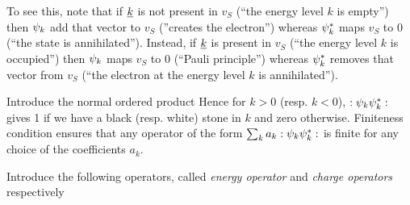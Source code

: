 \documentclass[../main/main.tex]{subfiles}
\begin{document}
To see this, note that if $\underline{k}$ is not present in $v_S$ (``the energy level $k$ is empty'') then $\psi_k$ add that vector to $v_S$ (''creates the electron'') whereas $\psi_k^*$ maps $v_S$ to 0 (``the state is annihilated''). Instead, if $\underline{k}$ is present in $v_S$ (``the energy level $k$ is occupied'') then $\psi_k$ maps $v_S$ to 0 (``Pauli principle'') whereas $\psi_k^*$ removes that vector from $v_S$ (``the electron at the energy level $k$ is annihilated''). 

Introduce the normal ordered product
Hence for $k>0$ (resp. $k<0$), $:{\psi_k\psi_k^*}:$ gives 1 if we have a black (resp. white) stone in $k$ and zero otherwise. Finiteness condition ensures that any operator of the form $\sum_{k}a_k:{\psi_k\psi_k^*}:$ is finite for any choice of the coefficients $a_k$. 

Introduce the following operators, called \emph{energy operator} and \emph{charge operators} respectively




 
\end{document}
